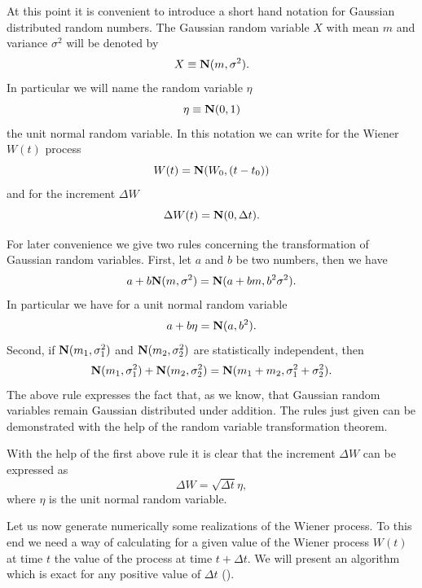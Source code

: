 At this point it is convenient to introduce a short hand notation 
for Gaussian distributed random numbers. The Gaussian random 
variable $X$ with mean $m$ and variance $\sigma^2$ will be denoted
by
\begin{equation*}
X \equiv {\bf N}(m,\sigma^2).
\end{equation*}
In particular we will name the random variable $\eta$
\begin{equation*}
\eta \equiv {\bf N}(0,1)
\end{equation*}
the unit normal random variable. In this notation we can write
for the Wiener $W(t)$ process
\begin{equation*}
W(t) = {\bf N} ( W_0, (t-t_0) )
\end{equation*}
and for the increment $\Delta W$
\begin{equation*}
\Delta W(t) = {\bf N} (0, 
     \Delta t ).
\end{equation*}

For later convenience we give two rules concerning the 
transformation of Gaussian random variables. First, let $a$ and $b$
be two numbers, then we have
\begin{equation*}
a +b {\bf N}(m,\sigma^2) = {\bf N} ( a+bm, b^2\sigma^2).
\end{equation*}
In particular we have for a unit normal random variable
\begin{equation*}
a+b\eta = {\bf N}(a,b^2).
\end{equation*}
Second, if ${\bf N}(m_1,\sigma_1^2)$ and ${\bf N}(m_2,\sigma_2^2)$ 
are statistically independent, then
\begin{equation*}
{\bf N}(m_1,\sigma_1^2) + {\bf N}(m_2,\sigma_2^2) =
   {\bf N}(m_1+m_2,\sigma_1^2+\sigma_2^2).
\end{equation*}
The above rule expresses the fact that, as we know, that Gaussian 
random variables remain Gaussian distributed under addition.
The rules just given can be demonstrated with the help of the 
random variable transformation theorem.

With the help of the first above rule it is clear that the 
increment $\Delta W$ can be expressed as
\begin{equation*}
\Delta W = \sqrt{\Delta t} \eta,
\end{equation*}
where $\eta$ is the unit normal random variable.

Let us now generate numerically some realizations of the Wiener 
process. To this end we need a way of calculating for a given 
value of the Wiener process $W(t)$ at time $t$ the value of the
process at time $t+\Delta t$. We will present an algorithm which
is exact for any positive value of $\Delta t$ (\cite{GILLESPIE}).

